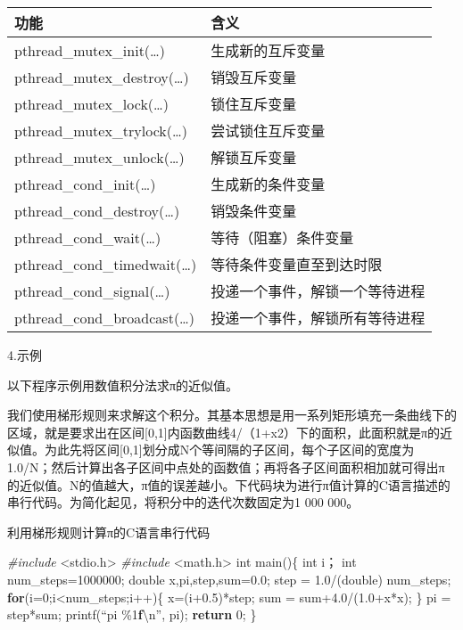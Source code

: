 \documentclass[]{ctexbook}
\newenvironment{Shaded}{\begin{snugshade}}{\end{snugshade}}
\newcommand{\ControlFlowTok}[1]{\textcolor[rgb]{0.13,0.29,0.53}{\textbf{#1}}}
\newcommand{\DataTypeTok}[1]{\textcolor[rgb]{0.13,0.29,0.53}{#1}}
\newcommand{\DecValTok}[1]{\textcolor[rgb]{0.00,0.00,0.81}{#1}}
\newcommand{\ErrorTok}[1]{\textcolor[rgb]{0.64,0.00,0.00}{\textbf{#1}}}
\newcommand{\FloatTok}[1]{\textcolor[rgb]{0.00,0.00,0.81}{#1}}
\newcommand{\ImportTok}[1]{#1}
\newcommand{\NormalTok}[1]{#1}
\newcommand{\PreprocessorTok}[1]{\textcolor[rgb]{0.56,0.35,0.01}{\textit{#1}}}
\begin{document}
\begin{longtable}[]{@{}ll@{}}
\toprule
功能 & 含义\tabularnewline
\midrule
\endhead
pthread\_mutex\_init(\ldots) & 生成新的互斥变量\tabularnewline
pthread\_mutex\_destroy(\ldots) & 销毁互斥变量\tabularnewline
pthread\_mutex\_lock(\ldots) & 锁住互斥变量\tabularnewline
pthread\_mutex\_trylock(\ldots) & 尝试锁住互斥变量\tabularnewline
pthread\_mutex\_unlock(\ldots) & 解锁互斥变量\tabularnewline
pthread\_cond\_init(\ldots) & 生成新的条件变量\tabularnewline
pthread\_cond\_destroy(\ldots) & 销毁条件变量\tabularnewline
pthread\_cond\_wait(\ldots) & 等待（阻塞）条件变量\tabularnewline
pthread\_cond\_timedwait(\ldots) & 等待条件变量直至到达时限\tabularnewline
pthread\_cond\_signal(\ldots) & 投递一个事件，解锁一个等待进程\tabularnewline
pthread\_cond\_broadcast(\ldots) & 投递一个事件，解锁所有等待进程\tabularnewline
\bottomrule
\end{longtable}

4.示例

以下程序示例用数值积分法求π的近似值。

我们使用梯形规则来求解这个积分。其基本思想是用一系列矩形填充一条曲线下的区域，就是要求出在区间{[}0,1{]}内函数曲线4/（1+x2）下的面积，此面积就是π的近似值。为此先将区间{[}0,1{]}划分成N个等间隔的子区间，每个子区间的宽度为1.0/N；然后计算出各子区间中点处的函数值；再将各子区间面积相加就可得出π的近似值。N的值越大，π值的误差越小。下代码块为进行π值计算的C语言描述的串行代码。为简化起见，将积分中的迭代次数固定为1 000 000。

利用梯形规则计算π的C语言串行代码

\begin{Shaded}
\begin{Highlighting}[]
\PreprocessorTok{\#include }\ImportTok{\textless{}stdio.h\textgreater{}}
\PreprocessorTok{\#include }\ImportTok{\textless{}math.h\textgreater{}}
\DataTypeTok{int}\NormalTok{ main()\{}
    \DataTypeTok{int}\NormalTok{ i；}
    \DataTypeTok{int}\NormalTok{ num\_steps=}\DecValTok{1000000}\NormalTok{;}
    \DataTypeTok{double}\NormalTok{ x,pi,step,sum=}\FloatTok{0.0}\NormalTok{;}
\NormalTok{    step = }\FloatTok{1.0}\NormalTok{/(}\DataTypeTok{double}\NormalTok{) num\_steps;}
    \ControlFlowTok{for}\NormalTok{(i=}\DecValTok{0}\NormalTok{;i\textless{}num\_steps;i++)\{  }
\NormalTok{        x=(i+}\FloatTok{0.5}\NormalTok{)*step;}
\NormalTok{        sum = sum+}\FloatTok{4.0}\NormalTok{/(}\FloatTok{1.0}\NormalTok{+x*x);}
\NormalTok{    \}}
\NormalTok{    pi = step*sum;}
\NormalTok{    printf(“pi \%}\DecValTok{1}\ErrorTok{f}\NormalTok{\textbackslash{}n”, pi);}
    \ControlFlowTok{return} \DecValTok{0}\NormalTok{;}
\NormalTok{\}}
\end{Highlighting}
\end{Shaded}
\end{document}
